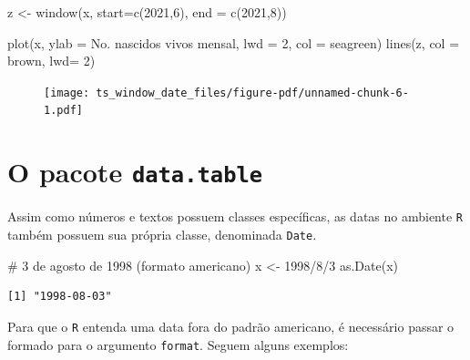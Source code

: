 \documentclass[
  letterpaper,
  DIV=11,
  numbers=noendperiod]{scrreprt}
\newenvironment{Shaded}{\begin{snugshade}}{\end{snugshade}}
\newcommand{\AttributeTok}[1]{\textcolor[rgb]{0.40,0.45,0.13}{#1}}
\newcommand{\CommentTok}[1]{\textcolor[rgb]{0.37,0.37,0.37}{#1}}
\newcommand{\DecValTok}[1]{\textcolor[rgb]{0.68,0.00,0.00}{#1}}
\newcommand{\FunctionTok}[1]{\textcolor[rgb]{0.28,0.35,0.67}{#1}}
\newcommand{\NormalTok}[1]{\textcolor[rgb]{0.00,0.23,0.31}{#1}}
\newcommand{\OtherTok}[1]{\textcolor[rgb]{0.00,0.23,0.31}{#1}}
\newcommand{\StringTok}[1]{\textcolor[rgb]{0.13,0.47,0.30}{#1}}
\theoremstyle{plain}
\theoremstyle{definition}
\theoremstyle{definition}
\theoremstyle{remark}
\begin{document}
\begin{Shaded}
\begin{Highlighting}[]
\NormalTok{z }\OtherTok{\textless{}{-}} \FunctionTok{window}\NormalTok{(x, }\AttributeTok{start=}\FunctionTok{c}\NormalTok{(}\DecValTok{2021}\NormalTok{,}\DecValTok{6}\NormalTok{), }\AttributeTok{end =} \FunctionTok{c}\NormalTok{(}\DecValTok{2021}\NormalTok{,}\DecValTok{8}\NormalTok{))}

\FunctionTok{plot}\NormalTok{(x, }\AttributeTok{ylab =} \StringTok{\textquotesingle{}No. nascidos vivos mensal\textquotesingle{}}\NormalTok{, }\AttributeTok{lwd =} \DecValTok{2}\NormalTok{, }\AttributeTok{col =} \StringTok{\textquotesingle{}seagreen\textquotesingle{}}\NormalTok{)}
\FunctionTok{lines}\NormalTok{(z, }\AttributeTok{col =} \StringTok{\textquotesingle{}brown\textquotesingle{}}\NormalTok{, }\AttributeTok{lwd=} \DecValTok{2}\NormalTok{)}
\end{Highlighting}
\end{Shaded}

\begin{figure}[H]

{\centering \texttt{[image: ts\_window\_date\_files/figure-pdf/unnamed-chunk-6-1.pdf]}

}

\end{figure}

\hypertarget{o-pacote-data.table}{%
\section{\texorpdfstring{O pacote
\texttt{data.table}}{O pacote data.table}}\label{o-pacote-data.table}}

Assim como números e textos possuem classes específicas, as datas no
ambiente \texttt{R} também possuem sua própria classe, denominada
\texttt{Date}.

\begin{Shaded}
\begin{Highlighting}[]
\CommentTok{\# 3 de agosto de 1998 (formato americano)}
\NormalTok{x }\OtherTok{\textless{}{-}} \StringTok{\textquotesingle{}1998/8/3\textquotesingle{}}
\FunctionTok{as.Date}\NormalTok{(x)}
\end{Highlighting}
\end{Shaded}

\begin{verbatim}
[1] "1998-08-03"
\end{verbatim}

Para que o \texttt{R} entenda uma data fora do padrão americano, é
necessário passar o formado para o argumento \texttt{format}. Seguem
alguns exemplos:
\end{document}
